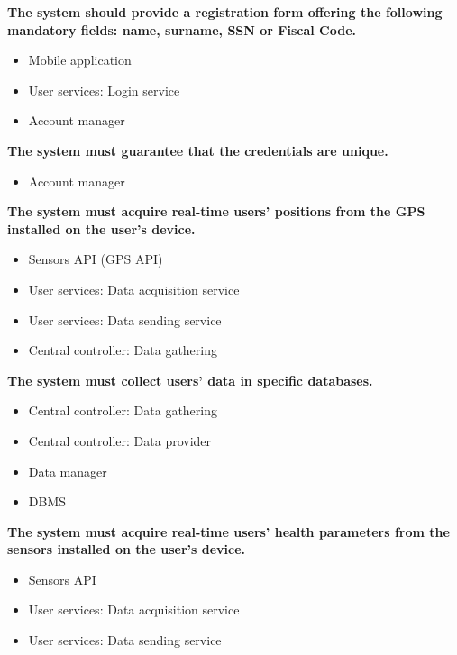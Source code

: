\begin{enumerate} [label={\bf[R\arabic*]}]
    \item \textbf{The system should provide a registration form offering the following mandatory fields: name, surname, SSN or Fiscal Code.}
        \begin{itemize}
            \item Mobile application
            \item User services: Login service
            \item Account manager
        \end{itemize}
    \item \textbf{The system must guarantee that the credentials are unique.}
        \begin{itemize}
            \item Account manager
        \end{itemize}
    \item \textbf{The system must acquire real-time users' positions from the GPS installed on the user's device.}
        \begin{itemize}
            \item Sensors API (GPS API)
            \item User services: Data acquisition service
            \item User services: Data sending service
            \item Central controller: Data gathering
        \end{itemize}
    \clearpage
    \item \textbf{The system must collect users' data in specific databases.}
        \begin{itemize}
            \item Central controller: Data gathering
            \item Central controller: Data provider
            \item Data manager
            \item DBMS
        \end{itemize}
    \item \textbf{The system must acquire real-time users' health parameters from the sensors installed on the user's device.}
        \begin{itemize}
            \item Sensors API
            \item User services: Data acquisition service
            \item User services: Data sending service

\end{itemize}
\end{enumerate}
